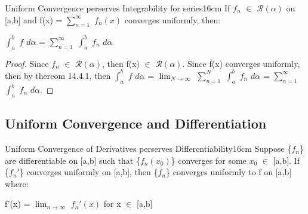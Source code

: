     \vspace{0.5cm}


    \begin{wtheorem}{Uniform Convergence perserves Integrability for series}{16cm}
        If $f_n$ $\in$ $\mathscr{R}(\alpha)$ on [a,b] and
        f(x) = $\sum_{n=1}^{\infty}$ $f_n(x)$ converges uniformly, then:

        \hspace{0.5cm}
        $\int_a^b$ $f$ $d\alpha$ = $\sum_{n=1}^{\infty}$ $\int_a^b$ $f_n$ $d\alpha$
    \end{wtheorem}

    \begin{proof}
        Since $f_n$ $\in$ $\mathscr{R}(\alpha)$, then
        f(x) $\in$ $\mathscr{R}(\alpha)$. Since f(x) converges uniformly, then
        by {\color{red} thereom 14.4.1}, then
        $\int_a^b$ $f$ $d\alpha$
        = $\lim_{N \rightarrow \infty}$ $\sum_{n=1}^{N}$ $\int_a^b$ $f_n$ $d\alpha$
        = $\sum_{n=1}^{\infty}$ $\int_a^b$ $f_n$ $d\alpha$.
    \end{proof}

    \newpage





\subsection[ Differentiation ]{ Uniform Convergence and Differentiation }

    \begin{wtheorem}{Uniform Convergence of Derivatives
    perserves Differentiability}{16cm}
        Suppose \{$f_n$\} are differentiable on [a,b] such that
        \{$f_n(x_0)$\} converges for some $x_0$ $\in$ [a,b]. If
        \{$f_n'$\} converges uniformly on [a,b], then \{$f_n$\}
        converges uniformly to f on [a,b] where:

        \hspace{0.5cm}
        f'(x) = $\lim_{n \rightarrow \infty}$ $f_n'(x)$
        \hspace{1cm}
        for x $\in$ [a,b]
    \end{wtheorem}

